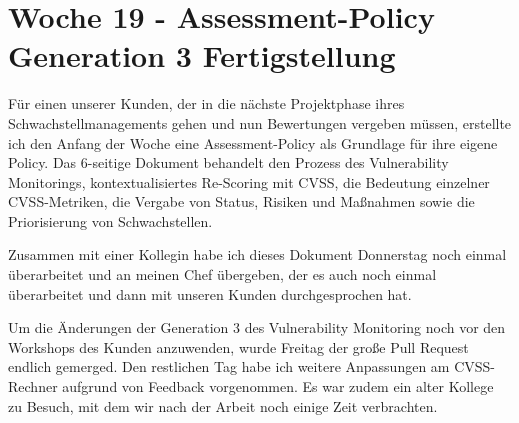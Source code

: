 \section{Woche 19 - Assessment-Policy \headerand Generation 3 Fertigstellung} \label{sec:bericht-wo-19}


\lweekdaymarginpar{\weekdayMondayShort\ - \weekdayWednesdayShort}

Für einen unserer Kunden, der in die nächste Projektphase ihres Schwachstellmanagements gehen und nun Bewertungen vergeben müssen, erstellte ich den Anfang der Woche eine Assessment-Policy als Grundlage für ihre eigene Policy.
Das 6-seitige Dokument behandelt den Prozess des Vulnerability Monitorings, kontextualisiertes Re-Scoring mit CVSS, die Bedeutung einzelner CVSS-Metriken, die Vergabe von Status, Risiken und Maßnahmen sowie die Priorisierung von Schwachstellen.

\sweekdaymarginpar{\weekdayThursdayLong}

Zusammen mit einer Kollegin habe ich dieses Dokument Donnerstag noch einmal überarbeitet und an meinen Chef übergeben, der es auch noch einmal überarbeitet und dann mit unseren Kunden durchgesprochen hat.

\sweekdaymarginpar{\weekdayFridayLong}

Um die Änderungen der Generation 3 des Vulnerability Monitoring noch vor den Workshops des Kunden anzuwenden, wurde Freitag der große Pull Request endlich gemerged.
Den restlichen Tag habe ich weitere Anpassungen am CVSS-Rechner aufgrund von Feedback vorgenommen.
Es war zudem ein alter Kollege zu Besuch, mit dem wir nach der Arbeit noch einige Zeit verbrachten.
